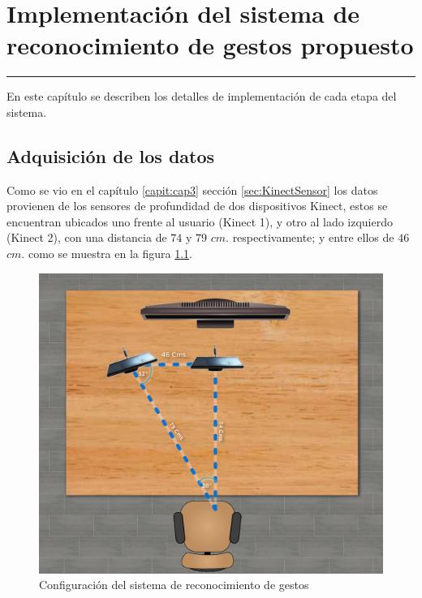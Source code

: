 \chapter{Implementación del sistema de reconocimiento de gestos propuesto}\label{capit:cap4}
\vspace{-2.0325ex}%
\noindent
\rule{\textwidth}{0.5pt}
\vspace{-5.5ex}%
\newcommand{\pushline}{\Indp}%

En este cap\'itulo se describen los detalles de implementación de cada etapa del sistema.   

\section{Adquisición de los datos}\label{sec:AdquisicionDatos}

Como se vio en el capítulo \ref{capit:cap3} sección \ref{sec:KinectSensor} los datos provienen de los sensores de profundidad de dos dispositivos Kinect, estos se encuentran ubicados uno frente al usuario (Kinect 1), y otro al lado  izquierdo (Kinect 2), con una distancia de $74$ y $79$ $cm.$ respectivamente; y entre ellos de $46$ $cm.$ como se muestra en la figura \ref{fig:SetupSystem}.
\begin{figure}[!h]
\begin{center}
\includegraphics[scale=.2]{./Figures/system.png}
\end{center}
\caption{Configuración del sistema de reconocimiento de gestos}
\label{fig:SetupSystem}
\end{figure}  

